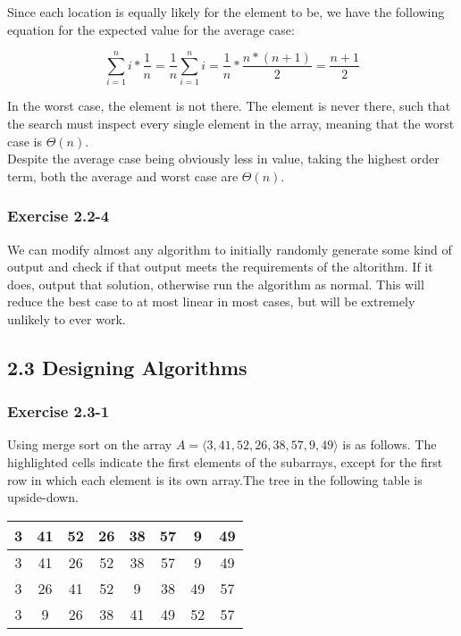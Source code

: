 \documentclass{article}
\begin{document}
Since each location is equally likely for the element to be, we have the following equation for the expected value for the average case:

\begin{center}
    $$\sum_{i=1}^{n} i*\frac{1}{n} = \frac{1}{n} \sum_{i=1}^{n} i = \frac{1}{n} * \frac{n * (n+1)}{2} = \frac{n+1}{2}$$
\end{center}

In the worst case, the element is not there. The element is never there, such that the search must inspect every single element in the array, meaning that the worst case is $\Theta(n)$. \\
Despite the average case being obviously less in value, taking the highest order term, both the average and worst case are $\Theta(n)$.

\subsubsection*{Exercise 2.2-4}

We can modify almost any algorithm to initially randomly generate some kind of output and check if that output meets the requirements of the altorithm. If it does, output that solution, otherwise run the algorithm as normal. This will reduce the best case to at most linear in most cases, but will be extremely unlikely to ever work.

\subsection*{2.3 Designing Algorithms}
\subsubsection*{Exercise 2.3-1}

Using merge sort on the array $A = \langle 3,41,52,26,38,57,9,49 \rangle$ is as follows. The highlighted cells indicate the first elements of the subarrays, except for the first row in which each element is its own array.The tree in the following table is upside-down.
\begin{center}
    \begin{tabular}{|c|c|c|c|c|c|c|c|} \hline
        3                       &   41  &   52                      &   26  &   38                      &   57  &   9                       &   49  \\ \hline
        \cellcolor{blue!25}3    &   41  &   \cellcolor{blue!25}26   &   52  &   \cellcolor{blue!25}38   &   57  &   \cellcolor{blue!25}9    &   49  \\ \hline
        \cellcolor{blue!25}3    &   26  &   41                      &   52  &   \cellcolor{blue!25}9    &   38  &   49                      &   57  \\ \hline
        \cellcolor{blue!25}3    &   9   &   26                      &   38  &   41                      &   49  &   52                      &   57  \\ \hline
    \end{tabular}
\end{center}
\end{document}
